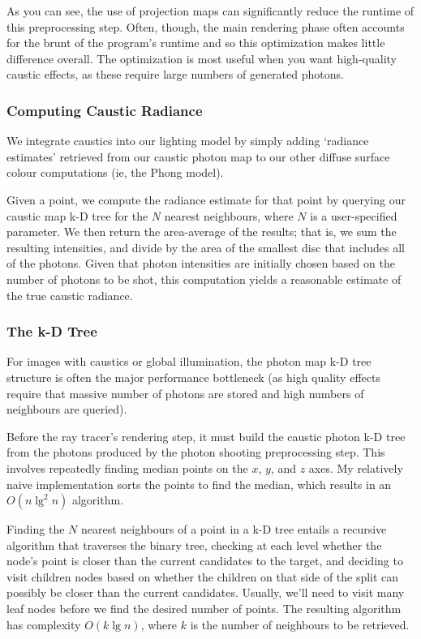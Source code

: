 \documentclass{article}
\begin{document}
As you can see, the use of projection maps can significantly reduce the runtime
of this preprocessing step. Often, though, the main rendering phase often accounts for
the brunt of the program's runtime and so this optimization makes little
difference overall. The optimization is most useful when you want high-quality
caustic effects, as these require large numbers of generated photons.


\subsubsection{Computing Caustic Radiance}

We integrate caustics into our lighting model by simply adding `radiance
estimates' retrieved from our caustic photon map to our other diffuse surface
colour computations (ie, the Phong model).

Given a point, we compute the radiance estimate for that point by querying our
caustic map k-D tree for the $N$ nearest neighbours, where $N$ is a
user-specified parameter. We then return the area-average of the results; that
is, we sum the resulting intensities, and divide by the area
of the smallest disc that includes all of the photons. Given that photon
intensities are initially chosen based on the number of photons to be shot, this
computation yields a reasonable estimate of the true caustic radiance.

\subsubsection{The k-D Tree}

For images with caustics or global illumination, the photon map k-D tree
structure is often the major performance bottleneck (as high quality
effects require that massive number of photons are stored and high numbers of
neighbours are queried).


Before the ray tracer's rendering step, it must build the caustic photon k-D
tree from the photons produced by the photon shooting preprocessing step.
This involves repeatedly finding median points on the $x$, $y$, and $z$ axes. My
relatively naive implementation sorts the points to find the median, which
results in an $O(n\lg^2{n})$ algorithm.

Finding the $N$ nearest neighbours of a point in a k-D tree entails a recursive
algorithm that traverses the binary tree, checking at each level whether the
node's point is closer than the current candidates to the target, and deciding
to visit children nodes based on whether the children on that side of the split
can possibly be closer than the current candidates. Usually, we'll need to visit
many leaf nodes before we find the desired number of points. The resulting
algorithm has complexity $O(k\lg{n})$, where $k$ is the number of neighbours to
be retrieved.
\end{document}
